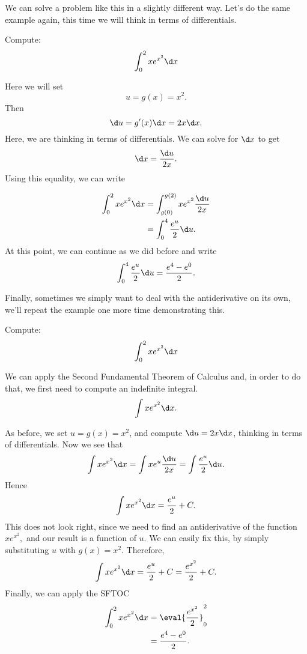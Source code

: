 \documentclass{ximera}
\begin{document}
We can solve a problem like this in a slightly different
way. Let's do the same example again, this time we will think in terms
of differentials.

\begin{example}\label{main example}
Compute:
\[
\int_0^2 x e^{x^2}\d x
\]
\begin{explanation}
Here we will set
\[ u=g(x) = x^2.
\]
 Then 
 \[
 \d u =g'(x)\d x=2x\d x.
 \]
Here, we are thinking in terms of differentials.
We can solve for $\d x$ to get 
\[
\d x = \frac{\d u}{2x}.
\]
Using this equality, we can write

\begin{align*}
\int_0^2 x e^{x^2}\d x &= \int_{g(0)}^{g(2)} x  e^{x^2} \frac{\d u}{2x}\\
  &= \int_{0}^{4} \frac{e^u}{2}\d u .
\end{align*}
At this point, we can continue as we did before and write
\[
 \int_{0}^{4} \frac{e^u}{2}\d u= \frac{e^4 -e^0}{2}.
\]
\end{explanation}
\end{example}

Finally, sometimes we simply want to deal with the antiderivative on
its own, we'll repeat the example one more time demonstrating this.

\begin{example}
Compute:
\[
\int_0^2 x e^{x^2}\d x
\]
\begin{explanation}
We can apply the Second Fundamental Theorem of Calculus and, in order to do that, we first need to compute an indefinite integral.
\[
\int  x e^{x^2} \d x.
\]

As before, we set $u=g(x)=x^2$, and compute $\d u =  2x \d x$,
 thinking in terms of differentials. Now we see that
\[
\int   x e^{x^2} \d x = \int x e^{u} \frac{\d u}{2x} = \int \frac{e^{u}}{2}\d u .
\]
Hence 
\[
\int  x e^{x^2} \d x = \frac{e^{u}}{2}+C .
\]
This does not look right, since  we need to find an antiderivative of the function $ x e^{x^2},$ and our result is a function of $u$.
We can easily fix this, by simply substituting $u$ with $g(x)=x^2$.
Therefore,
\[
\int xe^{x^2}\d x =\frac{e^{u}}{2}+C= \frac{e^{x^2}}{2}+C .
\]
Finally, we can apply the SFTOC
\begin{align*}
\int_0^2 x e^{x^2}\d x &=\eval{\frac{e^{x^2}}{2}}_0^2\\
&= \frac{e^4 -e^0}{2}.
\end{align*}
\end{explanation}
\end{example}
\end{document}

